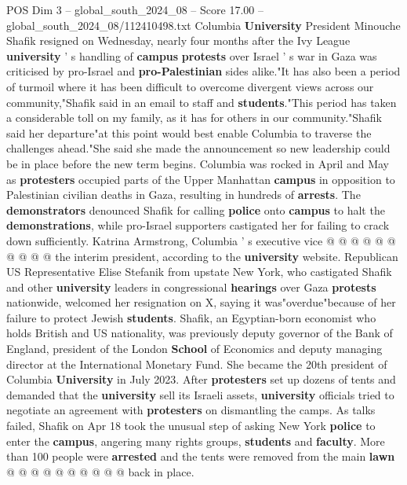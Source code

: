 \begin{textsample}{POS Dim 3 – global\_south\_2024\_08 – Score 17.00 – global\_south\_2024\_08/112410498.txt}  \label{ex:f3_pos_302}
Columbia \textbf{University} President Minouche Shafik resigned on Wednesday, nearly four months after the Ivy League \textbf{university} ' s handling of \textbf{campus} \textbf{protests} over Israel ' s war in Gaza was criticised by pro-Israel and \textbf{pro-Palestinian} sides alike."It has also been a period of turmoil where it has been difficult to overcome divergent views across our community,"Shafik said in an email to staff and \textbf{students}."This period has taken a considerable toll on my family, as it has for others in our community."Shafik said her departure"at this point would best enable Columbia to traverse the challenges ahead."She said she made the announcement so new leadership could be in place before the new term begins.
Columbia was rocked in April and May as \textbf{protesters} occupied parts of the Upper Manhattan \textbf{campus} in opposition to Palestinian civilian deaths in Gaza, resulting in hundreds of \textbf{arrests}.
The \textbf{demonstrators} denounced Shafik for calling \textbf{police} onto \textbf{campus} to halt the \textbf{demonstrations}, while pro-Israel supporters castigated her for failing to crack down sufficiently.
Katrina Armstrong, Columbia ' s executive vice @ @ @ @ @ @ @ @ @ @ the interim president, according to the \textbf{university} website.
Republican US Representative Elise Stefanik from upstate New York, who castigated Shafik and other \textbf{university} leaders in congressional \textbf{hearings} over Gaza \textbf{protests} nationwide, welcomed her resignation on X, saying it was"overdue"because of her failure to protect Jewish \textbf{students}.
Shafik, an Egyptian-born economist who holds British and US nationality, was previously deputy governor of the Bank of England, president of the London \textbf{School} of Economics and deputy managing director at the International Monetary Fund.
She became the 20th president of Columbia \textbf{University} in July 2023.
After \textbf{protesters} set up dozens of tents and demanded that the \textbf{university} sell its Israeli assets, \textbf{university} officials tried to negotiate an agreement with \textbf{protesters} on dismantling the camps.
As talks failed, Shafik on Apr 18 took the unusual step of asking New York \textbf{police} to enter the \textbf{campus}, angering many rights groups, \textbf{students} and \textbf{faculty}.
More than 100 people were \textbf{arrested} and the tents were removed from the main \textbf{lawn} @ @ @ @ @ @ @ @ @ @ back in place.

\end{textsample}
